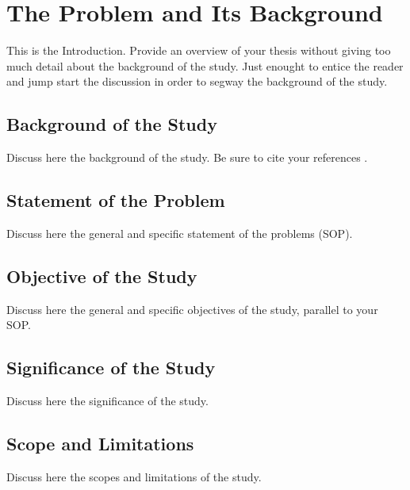 \chapter{The Problem and Its Background}

This is the Introduction. Provide an overview of your thesis without giving too much detail about the background of the study. Just enought to entice the reader and jump start the discussion in order to segway the background of the study.

\section{Background of the Study}

Discuss here the background of the study. Be sure to cite your references \nocite{*}.

\section{Statement of the Problem}
Discuss here the general and specific statement of the problems (SOP).

\section{Objective of the Study}
Discuss here the general and specific objectives of the study, parallel to your SOP.

\section{Significance of the Study}
Discuss here the significance of the study.

\section{Scope and Limitations}
Discuss here the scopes and limitations of the study.